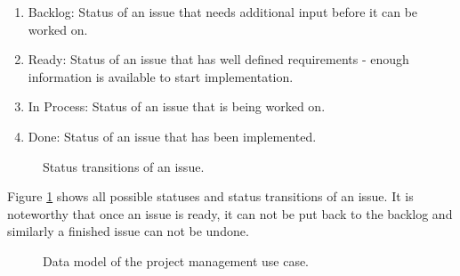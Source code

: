 \begin{enumerate}
  \item Backlog: Status of an issue that needs additional input before it can be worked on.
  \item Ready: Status of an issue that has well defined requirements - enough information is available to start implementation.
  \item In Process: Status of an issue that is being worked on.
  \item Done: Status of an issue that has been implemented.
\end{enumerate}

\begin{figure}[!htb]
  \caption{Status transitions of an issue.}
  \label{fig:statetransition}
\end{figure}

Figure \ref{fig:statetransition} shows all possible statuses and status transitions of an issue. It is noteworthy that once an issue is ready, it can not be put back to the backlog and similarly a finished issue can not be undone.

\begin{figure}[!htb]
  \caption{Data model of the project management use case.}
\end{figure}

